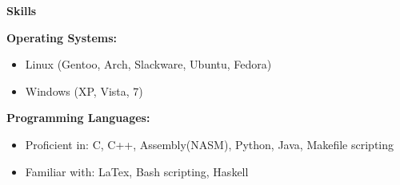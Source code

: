 \documentclass[letterpaper,11pt]{article}
\newcommand{\resheading}[1]{{\large \colorbox{mygrey}{\begin{minipage}{\textwidth}{\textbf{#1 \vphantom{p\^{E}}}}\end{minipage}}}}
\begin{document}
\resheading{{Skills}}
{ \footnotesize
	\begin{description}
		\item{\textbf{Operating Systems:}}
			\begin{itemize}
				\item{Linux (Gentoo, Arch, Slackware, Ubuntu, Fedora)}
				\item{Windows (XP, Vista, 7)}
			\end{itemize}
		\item{\textbf{Programming Languages: }}
			\begin{itemize}
				\item{Proficient in: }{C, C++, Assembly(NASM),  Python, Java, Makefile scripting}
				\item{Familiar with: }{LaTex, Bash scripting, Haskell}
			\end{itemize}
	\end{description}
}

\pagebreak
\end{document}
